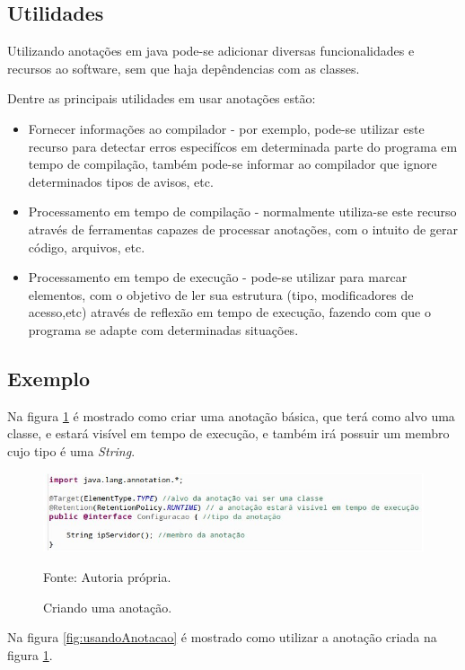 \documentclass[tc,openright]{iiufrgs}
\begin{document}
\subsection{Utilidades}

Utilizando anotações em java pode-se adicionar diversas funcionalidades e recursos ao software, sem que haja depêndencias com as classes.

 Dentre as principais utilidades em usar anotações estão:

\begin{itemize}
\item Fornecer informações ao compilador - por exemplo, pode-se utilizar este recurso para detectar erros especifícos em determinada parte do programa em tempo de compilação, também pode-se informar ao compilador que ignore determinados tipos de avisos, etc.
\item Processamento em tempo de compilação - normalmente utiliza-se este recurso através de ferramentas capazes de processar anotações, com o intuito de gerar código, arquivos, etc. 
\item Processamento em tempo de execução - pode-se utilizar para marcar elementos, com o objetivo de ler sua estrutura (tipo, modificadores de acesso,etc) através de reflexão em tempo de execução, fazendo com que o programa se adapte com determinadas situações.
\end{itemize}
\subsection{Exemplo}

Na figura \ref{fig:criandoAnotacao} é mostrado como criar uma anotação básica, que terá como alvo uma classe, e estará visível em tempo de execução, e também irá possuir um membro cujo tipo é uma \textit{String}.

\begin{figure}[ht]
	\centering
	\includegraphics[scale=0.6]{figuras/criandoAnnotation.jpg}
	\caption{Criando uma anotação.}
	\small{Fonte: Autoria própria.}
	\label{fig:criandoAnotacao}
\end{figure}

Na figura \ref{fig:usandoAnotacao} é mostrado como utilizar a anotação criada na figura \ref{fig:criandoAnotacao}.
\end{document}
